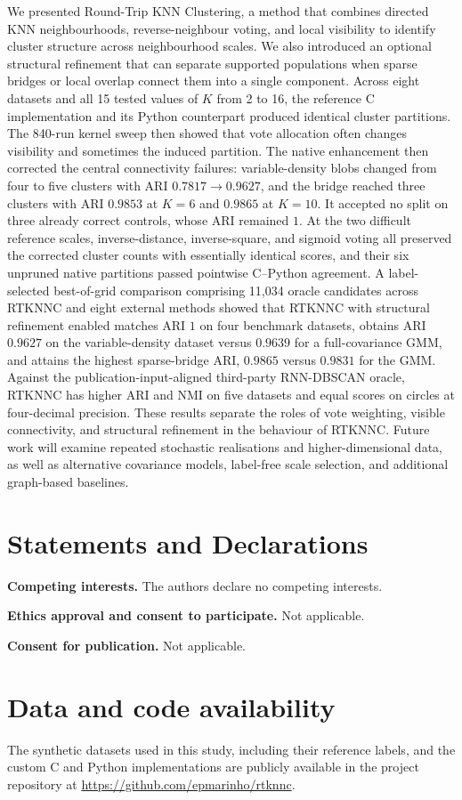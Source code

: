 \documentclass[review,12pt]{elsarticle}
\begin{document}
We presented Round-Trip KNN Clustering, a method that combines directed KNN
neighbourhoods, reverse-neighbour voting, and local visibility to identify
cluster structure across neighbourhood scales. We also introduced an optional
structural refinement that can separate supported populations when sparse
bridges or local overlap connect them into a single component. Across eight datasets and all
15 tested values of $K$ from 2 to 16, the reference C implementation and its
Python counterpart produced identical cluster partitions. The 840-run kernel
sweep then showed that vote allocation often changes visibility and sometimes
the induced partition.  The native enhancement then corrected the
central connectivity failures: variable-density blobs changed from four to
five clusters with ARI $0.7817\to0.9627$, and the bridge reached three clusters
with ARI $0.9853$ at $K=6$ and $0.9865$ at $K=10$.  It accepted no split on
three already correct controls, whose ARI remained $1$.  At the two difficult
reference scales, inverse-distance, inverse-square, and sigmoid voting all
preserved the corrected cluster counts with essentially identical scores, and
their six unpruned native partitions passed pointwise C--Python agreement.
A label-selected best-of-grid comparison comprising 11,034 oracle candidates
across RTKNNC and eight external methods showed that RTKNNC with structural
refinement enabled matches ARI $1$ on four benchmark datasets, obtains ARI
$0.9627$ on the variable-density dataset versus $0.9639$ for a full-covariance
GMM, and attains the highest sparse-bridge ARI, $0.9865$ versus $0.9831$ for
the GMM. Against the publication-input-aligned third-party RNN-DBSCAN oracle,
RTKNNC has higher ARI and NMI on five datasets and equal scores on circles
at four-decimal precision. These results separate the roles of vote weighting, visible connectivity, and
structural refinement in the behaviour of RTKNNC. Future work will examine
repeated stochastic realisations and higher-dimensional data, as well as
alternative covariance models, label-free scale selection, and additional
graph-based baselines.


\section*{Statements and Declarations}

\noindent\textbf{Competing interests.}
The authors declare no competing interests.

\medskip
\noindent\textbf{Ethics approval and consent to participate.}
Not applicable.

\medskip
\noindent\textbf{Consent for publication.}
Not applicable.

\medskip
\section*{Data and code availability}
The synthetic datasets used in this study, including their reference labels, and the custom C and Python implementations are publicly available in the project repository at \url{https://github.com/epmarinho/rtknnc}.



\end{document}
